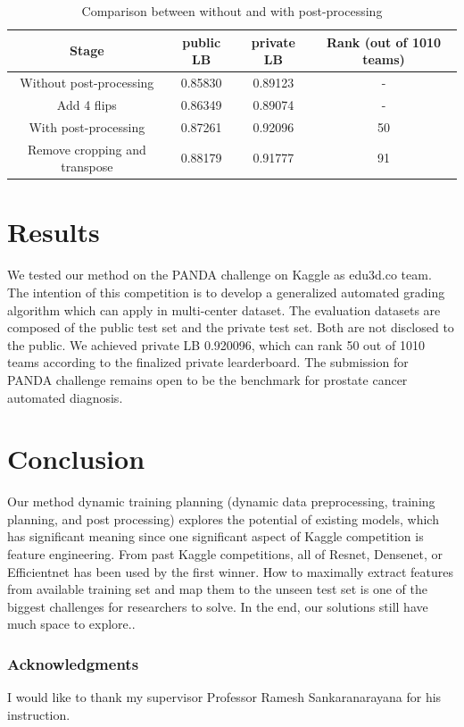 \documentclass{article}
\begin{document}
\begin{table}
\centering
\begin{tabular}{c | c | c | c}
\toprule
Stage & public LB & private LB & Rank (out of 1010 teams) \\
\toprule
Without post-processing & 0.85830 & 0.89123 & - \\
\hline
Add 4 flips & 0.86349 & 0.89074  &  - \\
With post-processing & 0.87261 & 0.92096 & 50 \\
\hline
Remove cropping and transpose & 0.88179 & 0.91777 & 91 \\
\bottomrule
\end{tabular}
\caption{Comparison between without and with post-processing}
\label{tab:com}
\end{table}



\section{Results}

We tested our method on the PANDA challenge on Kaggle as edu3d.co team. The intention of this competition is to develop a generalized automated grading algorithm which can apply in multi-center dataset. The evaluation datasets are composed of the public test set and the private test set. Both are not disclosed to the public. We achieved private LB 0.920096, which can rank 50 out of 1010 teams according to the finalized private learderboard. The submission for PANDA challenge remains open to be the benchmark for prostate cancer automated diagnosis. 






\section{Conclusion}

Our method dynamic training planning (dynamic data preprocessing, training planning, and post processing) explores the potential of existing models, which has significant meaning since one significant aspect of Kaggle competition is feature engineering. From past Kaggle competitions, all of Resnet, Densenet, or Efficientnet has been used by the first winner. How to maximally extract features from available training set and map them to the unseen test set is one of the biggest challenges for researchers to solve. In the end, our solutions still have much space to explore.. 

 

\subsubsection*{Acknowledgments}

I would like to thank my supervisor Professor Ramesh Sankaranarayana for his instruction.





\end{document}
